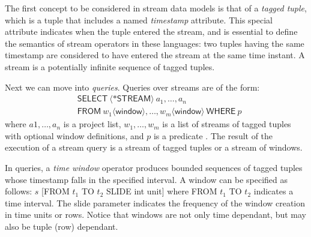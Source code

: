 The first concept to be considered in stream data models is that of a \textit{tagged tuple}, which is a tuple that
includes a named \textit{timestamp} attribute. This special attribute indicates when the tuple entered the stream, and
is essential to define the semantics of stream operators in these languages: two tuples having the same timestamp are
considered to have entered the stream at the same time instant. A stream is a potentially infinite sequence of tagged
tuples.

Next we can move into \emph{queries}. Queries over streams are of the form:
\begin{align*}
&\mathsf{SELECT}\ \langle\mathsf{*STREAM}\rangle\ a_1,\ldots ,a_n\  \\ &\mathsf{FROM}\ w_1 \langle \mathsf{window} \rangle,\ldots,w_m \langle \mathsf{window} \rangle\ \mathsf{WHERE}\ p 
\end{align*}
where $a1, \ldots ,a_n$ is a project list, $w_1, \ldots , w_m$ is a list of streams of tagged tuples with optional
window definitions, and $p$ is a predicate \cite{Arasu_2006,Brenninkmeijer_08}. The result of the execution of a stream
query is a stream of tagged tuples or a stream of windows.

In queries, a \emph{time window} operator produces bounded sequences of tagged tuples whose timestamp falls in the
specified interval. A window can be specified as follows: $s$ \textsf{[FROM} $t_1$ \textsf{TO} $t_2$ \textsf{SLIDE int
unit]} where \textsf{FROM} $t_1$ \textsf{TO} $t_2$ indicates a time interval. The slide parameter indicates the
frequency of the window creation in time units or rows.
Notice that windows are not only time dependant, but may also be tuple (row) dependant.

